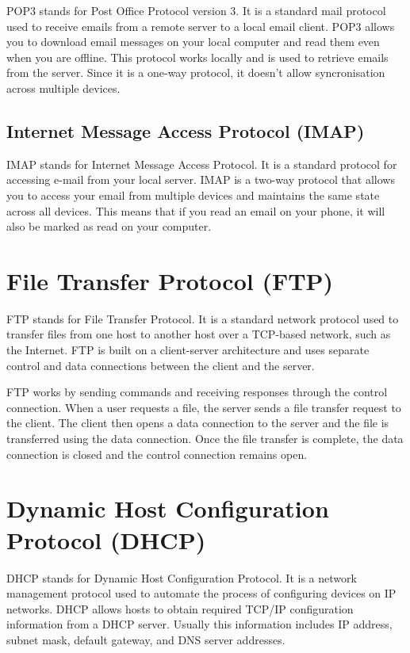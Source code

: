 \documentclass[12pt,titlepage]{article}
\begin{document}
POP3 stands for Post Office Protocol version 3. It is a standard mail protocol used to receive emails from a remote server to a local email client. POP3 allows you to download
email messages on your local computer and read them even when you are offline. This protocol works locally
and is used to retrieve emails from the server. Since it is a one-way protocol, it doesn't allow syncronisation across multiple
devices.

\subsection{Internet Message Access Protocol (IMAP)}

IMAP stands for Internet Message Access Protocol. It is a standard protocol for accessing e-mail from your
local server. IMAP is a two-way protocol that allows you to access your email from multiple devices and
maintains the same state across all devices. This means that if you read an email on your phone, it will
also be marked as read on your computer.

\section{File Transfer Protocol (FTP)}

FTP stands for File Transfer Protocol. It is a standard network protocol used to transfer files from one host
to another host over a TCP-based network, such as the Internet. FTP is built on a client-server architecture
and uses separate control and data connections between the client and the server.

FTP works by sending commands and receiving responses through the control connection. When a user requests
a file, the server sends a file transfer request to the client. The client then opens a data connection to the
server and the file is transferred using the data connection. Once the file transfer is complete, the data
connection is closed and the control connection remains open.

\section{Dynamic Host Configuration Protocol (DHCP)}

DHCP stands for Dynamic Host Configuration Protocol. It is a network management protocol used to automate
the process of configuring devices on IP networks. DHCP allows hosts to obtain required TCP/IP configuration information
from a DHCP server. Usually this information includes IP address, subnet mask, default gateway, and DNS server
addresses.
\end{document}
